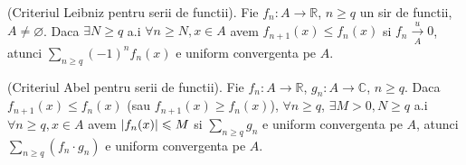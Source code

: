 \documentclass{article}
\begin{document}
\begin{enumerate}
\begin{tcolorbox}
  \propozitie (Criteriul Leibniz pentru serii de functii). Fie $f_n : A \to \mathbb{R}$, $n \geq q$ un sir de functii, $A \neq \varnothing$. Daca $\exists N \geq q$ a.i $\forall n \geq N, x \in A$ avem $f_{n+1}(x) \leq f_n(x)$ si $f_n \xrightarrow[A]{u} 0$, atunci $\sum_{n \geq q} (-1)^n f_n(x)$ e uniform convergenta pe $A$.
\end{tcolorbox}

\begin{tcolorbox}
  \propozitie (Criteriul Abel pentru serii de functii). Fie $f_n : A \to \mathbb{R}$, $g_n : A \to \mathbb{C}$, $n \geq q$.  Daca $f_{n+1}(x) \leq f_n(x)$ (sau $f_{n+1}(x) \geq f_n(x)$), $\forall n \geq q$, $\exists M > 0, N \geq q$ a.i $\forall n \geq q, x \in A$ avem $\left\lvert f_n(x) \right\rvert \leqslant M$ si $\sum_{n \geq q} g_n$ e uniform convergenta pe $A$, atunci $\sum_{n \geq q} (f_n \cdot g_n)$ e uniform convergenta pe $A$.
\end{tcolorbox}
  



\end{enumerate}
\end{document}

